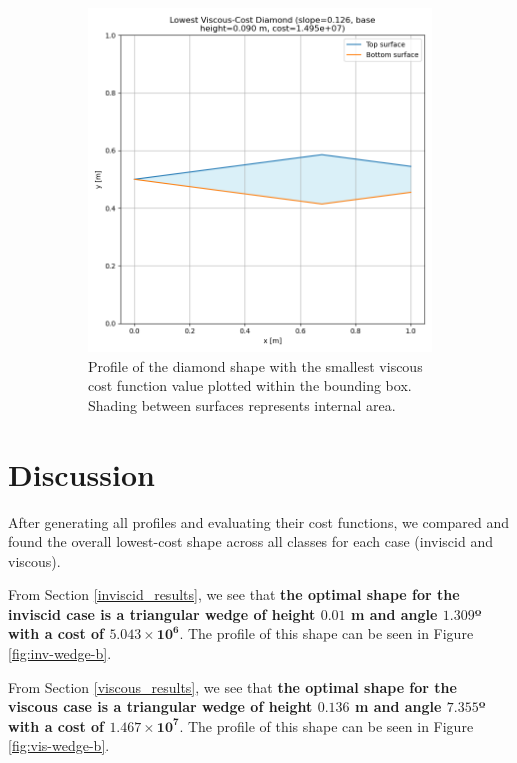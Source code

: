 \documentclass[11pt]{article}
\begin{document}
\begin{figure}[H]
\begin{subfigure}[b]{0.44\textwidth}
    \includegraphics[width=\linewidth]{../results/viscous/lowest_cost_diamond.png}
    \caption{Profile of the diamond shape with the smallest viscous cost function value plotted within the bounding box. Shading between surfaces represents internal area.}
    \label{fig:vis-diamond-b}
\end{subfigure}
\caption{}
\label{fig:vis-diamond}
\end{figure}

\section{Discussion}
After generating all profiles and evaluating their cost functions, we compared and found the overall lowest-cost shape across all classes for each case (inviscid and viscous).

From Section \ref{inviscid_results}, we see that \textbf{the optimal shape for the inviscid case is a triangular wedge of height $\mathbf{0.01}$ m and angle $\mathbf{1.309}$º with a cost of $\mathbf{5.043 \times 10^6}$}. The profile of this shape can be seen in Figure \ref{fig:inv-wedge-b}.

From Section \ref{viscous_results}, we see that \textbf{the optimal shape for the viscous case is a triangular wedge of height $\mathbf{0.136}$ m and angle $\mathbf{7.355}$º with a cost of $\mathbf{1.467 \times 10^7}$}. The profile of this shape can be seen in Figure \ref{fig:vis-wedge-b}.
\end{document}

